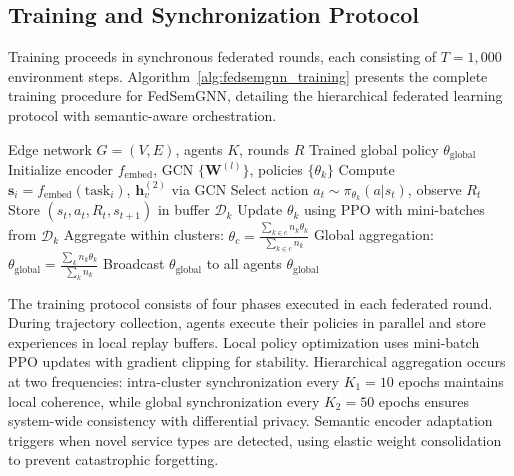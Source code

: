 \documentclass[conference]{IEEEtran}
\begin{document}
	\subsection{Training and Synchronization Protocol}
	Training proceeds in synchronous federated rounds, each consisting of $T = 1{,}000$ environment steps. Algorithm~\ref{alg:fedsemgnn_training} presents the complete training procedure for FedSemGNN, detailing the hierarchical federated learning protocol with semantic-aware orchestration.
	
	\begin{algorithm}[t]
		\caption{FedSemGNN Training Protocol}
		\label{alg:fedsemgnn_training}
		\begin{algorithmic}[1]
			\REQUIRE Edge network $G=(V,E)$, agents $K$, rounds $R$
			\ENSURE Trained global policy $\theta_{\text{global}}$
			\STATE Initialize encoder $f_{\text{embed}}$, GCN $\{\mathbf{W}^{(l)}\}$, policies $\{\theta_k\}$
			\STATE Compute $\mathbf{s}_i = f_{\text{embed}}(\text{task}_i)$, $\mathbf{h}_v^{(2)}$ via GCN
			\STATE Select action $a_t \sim \pi_{\theta_k}(a|s_t)$, observe $R_t$
			\STATE Store $(s_t, a_t, R_t, s_{t+1})$ in buffer $\mathcal{D}_k$
			\ENDFOR
			\STATE Update $\theta_k$ using PPO with mini-batches from $\mathcal{D}_k$
			\ENDFOR
			\STATE
			\STATE Aggregate within clusters: $\theta_c = \frac{\sum_{k \in c} n_k \theta_k}{\sum_{k \in c} n_k}$
			\ENDIF
			\STATE
			\STATE Global aggregation: $\theta_{\text{global}} = \frac{\sum_k n_k \theta_k}{\sum_k n_k}$
			\STATE Broadcast $\theta_{\text{global}}$ to all agents
			\ENDIF
			\ENDFOR
			\STATE
			\RETURN $\theta_{\text{global}}$
		\end{algorithmic}
	\end{algorithm}
	
	The training protocol consists of four phases executed in each federated round. During trajectory collection, agents execute their policies in parallel and store experiences in local replay buffers. Local policy optimization uses mini-batch PPO updates with gradient clipping for stability. Hierarchical aggregation occurs at two frequencies: intra-cluster synchronization every $K_1=10$ epochs maintains local coherence, while global synchronization every $K_2=50$ epochs ensures system-wide consistency with differential privacy. Semantic encoder adaptation triggers when novel service types are detected, using elastic weight consolidation to prevent catastrophic forgetting.
	
\end{document}

